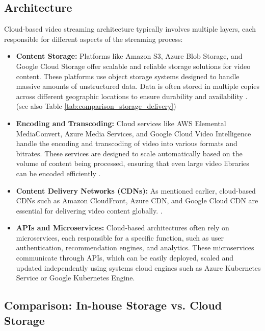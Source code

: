 \subsection{Architecture}
Cloud-based video streaming architecture typically involves multiple layers, each responsible for different aspects of the streaming process:

\begin{itemize}
    \item \textbf{Content Storage:} Platforms like Amazon S3, Azure Blob Storage, and Google Cloud Storage offer scalable and reliable storage solutions for video content. These platforms use object storage systems designed to handle massive amounts of unstructured data. Data is often stored in multiple copies across different geographic locations to ensure durability and availability \cite{cloud_storage_video}. (see also Table \ref{tab:comparison_storage_delivery})
    
    \item \textbf{Encoding and Transcoding:} Cloud services like AWS Elemental MediaConvert, Azure Media Services, and Google Cloud Video Intelligence handle the encoding and transcoding of video into various formats and bitrates. These services are designed to scale automatically based on the volume of content being processed, ensuring that even large video libraries can be encoded efficiently \cite{cloud_transcoding_video}.
    
    \item \textbf{Content Delivery Networks (CDNs):} As mentioned earlier, cloud-based \ac{CDN}s such as Amazon CloudFront, Azure CDN, and Google Cloud CDN are essential for delivering video content globally. \cite{cloud_cdn_video}.
    
    \item \textbf{\ac{API}s and Microservices:} Cloud-based architectures often rely on microservices, each responsible for a specific function, such as user authentication, recommendation engines, and analytics. These microservices communicate through \ac{API}s, which can be easily deployed, scaled and updated independently using systems cloud engines such as Azure Kubernetes Service or Google Kubernetes Engine\cite{microservices_video}.
\end{itemize}

\subsection{Comparison: In-house Storage vs. Cloud Storage}

